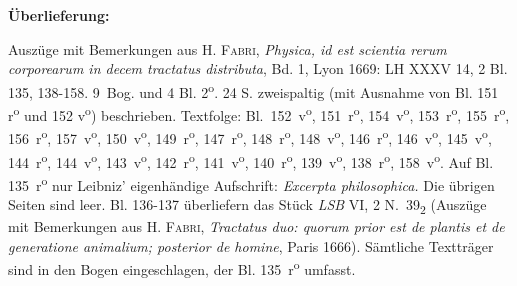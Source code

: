 % 
\begin{ledgroupsized}[r]{120mm}
\footnotesize 
\pstart 
\noindent\textbf{\"{U}berlieferung:} 
\pend
\end{ledgroupsized}
\begin{ledgroupsized}[r]{114mm}
\footnotesize 
\pstart \parindent -6mm
%
Auszüge mit Bemerkungen aus \cite{00044}\textsc{H. Fabri}, \textit{Physica, id est scientia rerum corporearum in decem tractatus distributa}, Bd. 1, Lyon 1669: LH XXXV 14, 2 Bl. 135, 138-158.
9~Bog. und 4 Bl. 2\textsuperscript{o}. 24 S. zweispaltig (mit Ausnahme von Bl. 151 r\textsuperscript{o} und 152 v\textsuperscript{o}) beschrieben.
Textfolge:
Bl.~152~v\textsuperscript{o}, 151~r\textsuperscript{o}, 154~v\textsuperscript{o}, 153~r\textsuperscript{o}, 155~r\textsuperscript{o}, 156~r\textsuperscript{o}, 157~v\textsuperscript{o}, 150~v\textsuperscript{o}, 149~r\textsuperscript{o}, 147~r\textsuperscript{o}, 148~r\textsuperscript{o}, 148~v\textsuperscript{o}, 146~r\textsuperscript{o}, 146~v\textsuperscript{o}, 145~v\textsuperscript{o}, 144~r\textsuperscript{o}, 144~v\textsuperscript{o}, 143~v\textsuperscript{o}, 142~r\textsuperscript{o}, 141~v\textsuperscript{o}, 140~r\textsuperscript{o}, 139~v\textsuperscript{o}, 138~r\textsuperscript{o}, 158~v\textsuperscript{o}.
Auf Bl. 135~r\textsuperscript{o} nur Leibniz' eigenhändige Aufschrift: \textit{Excerpta philosophica.}
Die übrigen Seiten sind leer.
Bl. 136-137 überliefern das Stück \cite{01120}\textit{LSB} VI, 2 N.~39\textsubscript{2} (Auszüge mit Bemerkungen aus \cite{00043}\textsc{H. Fabri}, \textit{Tractatus duo: quorum prior est de plantis et de generatione animalium; posterior de homine}, Paris 1666).
Sämtliche Texttr\"{a}ger sind in den Bogen eingeschlagen, der Bl. 135~r\textsuperscript{o} umfasst.

\end{ledgroupsized}
